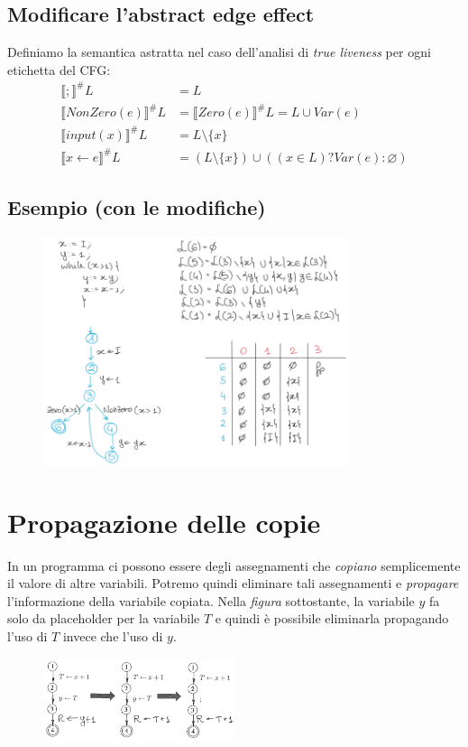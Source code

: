 \documentclass[a4paper,oneside,titlepage]{book}
\begin{document}
\subsection{Modificare l'abstract edge effect}
Definiamo la semantica astratta nel caso dell'analisi di \textit{true liveness} per ogni etichetta del CFG:
\begin{align*}
    \llbracket ; \rrbracket^\# L &= L \\
    \llbracket NonZero(e) \rrbracket^\# L &= \llbracket Zero(e) \rrbracket^\# L = L \cup Var(e) \\
    \llbracket input(x) \rrbracket^\# L &= L \setminus \{ x \} \\
    \llbracket x \leftarrow e \rrbracket^\# L &= (L \setminus \{ x \}) \cup ((x \in L)?Var(e):\varnothing)
\end{align*}

\subsection{Esempio (con le modifiche)}
\begin{figure}[htp]
	\centering
	\includegraphics[width=0.8\textwidth]{liveness8.png}
\end{figure}


\section{Propagazione delle copie} %
\label{copy1}
In un programma ci possono essere degli assegnamenti che \textit{copiano} semplicemente il valore di altre variabili. Potremo quindi eliminare tali assegnamenti e \textit{propagare} l'informazione della variabile copiata. Nella \textit{figura} sottostante, la variabile $y$ fa solo da placeholder per la variabile $T$ e quindi è possibile eliminarla propagando l'uso di $T$ invece che l'uso di $y$.
\begin{figure}[htp]
	\centering
	\includegraphics[width=0.5\textwidth]{copy1.png}
\end{figure}
\end{document}

